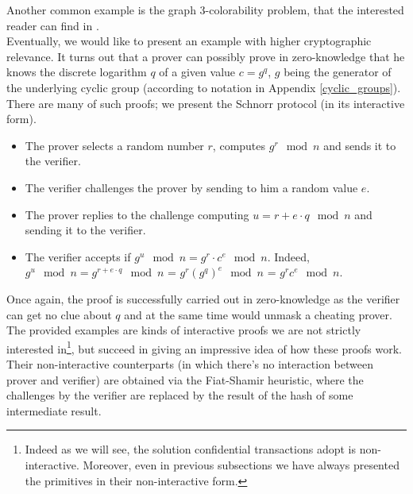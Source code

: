 Another common example is the graph 3-colorability problem, that the interested reader can find in \cite{PedroFranco}.\\
Eventually, we would like to present an example with higher cryptographic relevance. It turns out that a prover can possibly prove in zero-knowledge that he knows the discrete logarithm $q$ of a given value $c = g^q$, $g$ being the generator of the underlying cyclic group (according to notation in Appendix \ref{cyclic_groups}). There are many of such proofs; we present the Schnorr protocol (in its interactive form).
\begin{itemize}
    \item The prover selects a random number $r$, computes $g^r \mod{n}$ and sends it to the verifier.
    \item The verifier challenges the prover by sending to him a random value $e$. 
    \item The prover replies to the challenge computing $u = r + e\cdot q \mod{n} $ and sending it to the verifier.
    \item The verifier accepts if $g^u \mod{n} = g^r\cdot c^e \mod{n}$. Indeed, $g^u \mod{n} = g^{r + e\cdot q} \mod{n}$ = $g^r {(g^q)}^e \mod{n}$ = $g^r c^e \mod{n}$.
\end{itemize}
Once again, the proof is successfully carried out in zero-knowledge as the verifier can get no clue about $q$ and at the same time would unmask a cheating prover.\\ 
The provided examples are kinds of interactive proofs we are not strictly interested in\footnote{Indeed as we will see, the solution confidential transactions adopt is non-interactive. Moreover, even in previous subsections we have always presented the primitives in their non-interactive form.}, but succeed in giving an impressive idea of how these proofs work. Their non-interactive counterparts (in which there's no interaction between prover and verifier) are obtained via the Fiat-Shamir heuristic, where the challenges by the verifier are replaced by the result of the hash of some intermediate result. 

